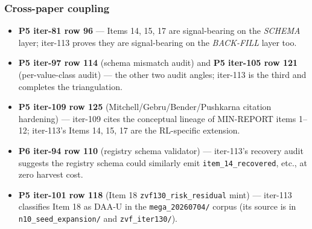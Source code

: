 \subsubsection{Cross-paper coupling}

\begin{itemize}
  \item \textbf{P5 iter-81 row 96} --- Items 14, 15, 17 are
        signal-bearing on the \emph{SCHEMA} layer; iter-113 proves they
        are signal-bearing on the \emph{BACK-FILL} layer too.
  \item \textbf{P5 iter-97 row 114} (schema mismatch audit) and
        \textbf{P5 iter-105 row 121} (per-value-class audit) --- the
        other two audit angles; iter-113 is the third and completes
        the triangulation.
  \item \textbf{P5 iter-109 row 125} (Mitchell/Gebru/Bender/Pushkarna
        citation hardening) --- iter-109 cites the conceptual lineage
        of MIN-REPORT items 1--12; iter-113's Items 14, 15, 17 are the
        RL-specific extension.
  \item \textbf{P6 iter-94 row 110} (registry schema validator) ---
        iter-113's recovery audit suggests the registry schema could
        similarly emit \texttt{item\_14\_recovered}, etc., at zero
        harvest cost.
  \item \textbf{P5 iter-101 row 118} (Item 18 \texttt{zvf130\_risk\_residual}
        mint) --- iter-113 classifies Item 18 as DAA-U in the
        \texttt{mega\_20260704/} corpus (its source is in
        \texttt{n10\_seed\_expansion/} and \texttt{zvf\_iter130/}).
\end{itemize}
